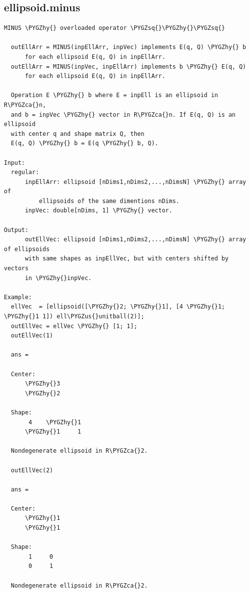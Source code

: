 \documentclass[letterpaper,10pt,english]{sphinxmanual}
\def\PYGZus{\char`\_}
\def\PYGZca{\char`\^}
\def\PYGZhy{\char`\-}
\def\PYGZsq{\char`\'}
\begin{document}
\subsection{ellipsoid.minus}
\label{chap_functions:ellipsoid-minus}
\begin{Verbatim}[commandchars=\\\{\}]
MINUS \PYGZhy{} overloaded operator \PYGZsq{}\PYGZhy{}\PYGZsq{}

  outEllArr = MINUS(inpEllArr, inpVec) implements E(q, Q) \PYGZhy{} b
      for each ellipsoid E(q, Q) in inpEllArr.
  outEllArr = MINUS(inpVec, inpEllArr) implements b \PYGZhy{} E(q, Q)
      for each ellipsoid E(q, Q) in inpEllArr.

  Operation E \PYGZhy{} b where E = inpEll is an ellipsoid in R\PYGZca{}n,
  and b = inpVec \PYGZhy{} vector in R\PYGZca{}n. If E(q, Q) is an ellipsoid
  with center q and shape matrix Q, then
  E(q, Q) \PYGZhy{} b = E(q \PYGZhy{} b, Q).

Input:
  regular:
      inpEllArr: ellipsoid [nDims1,nDims2,...,nDimsN] \PYGZhy{} array of
          ellipsoids of the same dimentions nDims.
      inpVec: double[nDims, 1] \PYGZhy{} vector.

Output:
      outEllVec: ellipsoid [nDims1,nDims2,...,nDimsN] \PYGZhy{} array of ellipsoids
      with same shapes as inpEllVec, but with centers shifted by vectors
      in \PYGZhy{}inpVec.

Example:
  ellVec  = [ellipsoid([\PYGZhy{}2; \PYGZhy{}1], [4 \PYGZhy{}1; \PYGZhy{}1 1]) ell\PYGZus{}unitball(2)];
  outEllVec = ellVec \PYGZhy{} [1; 1];
  outEllVec(1)

  ans =

  Center:
      \PYGZhy{}3
      \PYGZhy{}2

  Shape:
       4    \PYGZhy{}1
      \PYGZhy{}1     1

  Nondegenerate ellipsoid in R\PYGZca{}2.

  outEllVec(2)

  ans =

  Center:
      \PYGZhy{}1
      \PYGZhy{}1

  Shape:
       1     0
       0     1

  Nondegenerate ellipsoid in R\PYGZca{}2.
\end{Verbatim}
\end{document}
